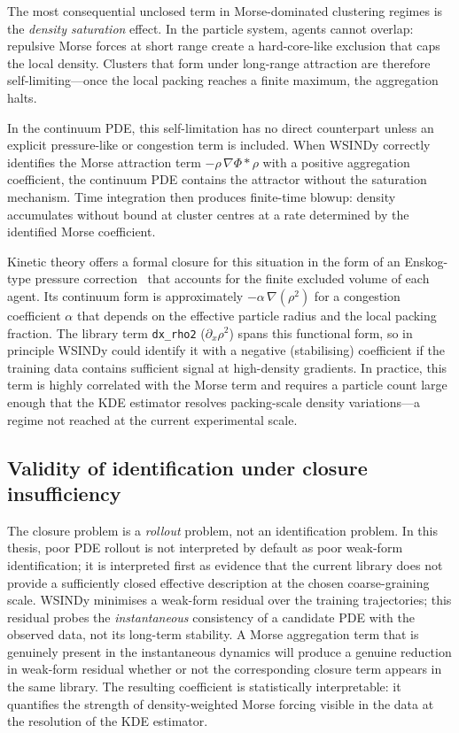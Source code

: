The most consequential unclosed term in Morse-dominated clustering regimes is
the \emph{density saturation} effect.  In the particle system, agents cannot
overlap: repulsive Morse forces at short range create a hard-core-like
exclusion that caps the local density.  Clusters that form under long-range
attraction are therefore self-limiting---once the local packing reaches a
finite maximum, the aggregation halts.

In the continuum PDE, this self-limitation has no direct counterpart unless an
explicit pressure-like or congestion term is included.  When WSINDy correctly
identifies the Morse attraction term $-\rho\,\nabla\Phi * \rho$ with a
positive aggregation coefficient, the continuum PDE contains the attractor
without the saturation mechanism.  Time integration then produces finite-time
blowup: density accumulates without bound at cluster centres at a rate
determined by the identified Morse coefficient.

Kinetic theory offers a formal closure for this situation in the form of an
Enskog-type pressure correction~\cite{callaham2021dominant} that accounts for the finite excluded
volume of each agent.  Its continuum form is approximately $-\alpha\,\nabla(\rho^2)$
for a congestion coefficient $\alpha$ that depends on the effective particle
radius and the local packing fraction.  The library term \texttt{dx\_rho2}
($\partial_x \rho^2$) spans this functional form, so in principle WSINDy could
identify it with a negative (stabilising) coefficient if the training data
contains sufficient signal at high-density gradients.  In practice, this term
is highly correlated with the Morse term and requires a particle count large
enough that the KDE estimator resolves packing-scale density variations---a
regime not reached at the current experimental scale.

\subsection{Validity of identification under closure insufficiency}

The closure problem is a \emph{rollout} problem, not an identification problem.
In this thesis, poor PDE rollout is not interpreted by default as poor
weak-form identification; it is interpreted first as evidence that the current
library does not provide a sufficiently closed effective description at the
chosen coarse-graining scale.
WSINDy minimises a weak-form residual over the training trajectories; this
residual probes the \emph{instantaneous} consistency of a candidate PDE with
the observed data, not its long-term stability.  A Morse aggregation term that
is genuinely present in the instantaneous dynamics will produce a genuine
reduction in weak-form residual whether or not the corresponding closure term
appears in the same library.  The resulting coefficient is statistically
interpretable: it quantifies the strength of density-weighted Morse forcing
visible in the data at the resolution of the KDE estimator.

